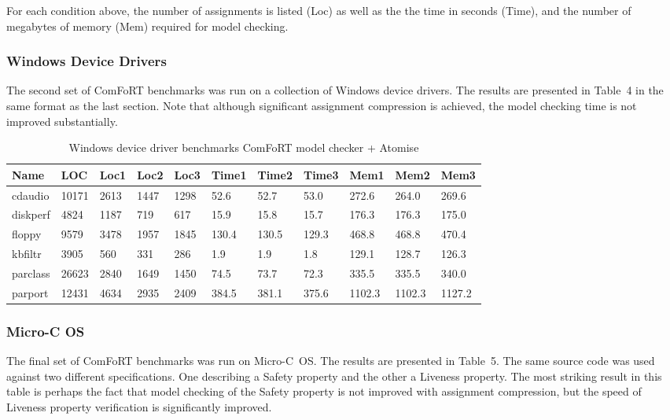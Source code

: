 For each condition above, the number of assignments is listed (Loc) as
well as the the time in seconds (Time), and the number of megabytes of
memory (Mem) required for model checking.

\subsubsection{Windows Device Drivers}

The second set of ComFoRT benchmarks was run on a collection of
Windows device drivers.  The results are presented in Table~4 in the
same format as the last section.  Note that although significant
assignment compression is achieved, the model checking time is not
improved substantially.

\begin{table}
\begin{scriptsize}
\begin{tabular}{|l|l|l|l|l|l|l|l|l|l|l|} \hline
Name & LOC & Loc1 & Loc2 & Loc3 & Time1 & Time2 & Time3 & Mem1 & Mem2
& Mem3 \\ \hline
cdaudio & 10171 & 2613 & 1447 & 1298 & 52.6 & 52.7 & 53.0 & 272.6 &
264.0 & 269.6\\ \hline
diskperf & 4824 & 1187 & 719 & 617 & 15.9 & 15.8 & 15.7 & 176.3 &
176.3 & 175.0 \\ \hline
floppy & 9579 & 3478 & 1957 & 1845 & 130.4 & 130.5 & 129.3 & 468.8 &
468.8 & 470.4 \\ \hline
kbfiltr & 3905 & 560 & 331 & 286 & 1.9 & 1.9 & 1.8 & 129.1 & 128.7 &
126.3 \\ \hline
parclass & 26623 & 2840 & 1649 & 1450 & 74.5 & 73.7 & 72.3 & 335.5 &
335.5 & 340.0 \\ \hline
parport & 12431 & 4634 & 2935 & 2409 & 384.5 & 381.1 & 375.6 & 1102.3
& 1102.3 & 1127.2 \\ \hline
\end{tabular}
\label{windows}
\caption{Windows device driver benchmarks ComFoRT model checker + Atomise}
\end{scriptsize}
\end{table}

\subsubsection{Micro-C OS}

The final set of ComFoRT benchmarks was run on Micro-C~OS.  The results
are presented in Table~5.  The same source code was used
against two different specifications.  One describing a Safety
property and the other a Liveness property.  The most striking result
in this table is perhaps the fact that model checking of the Safety
property is not improved with assignment compression, but the speed of
Liveness property verification is significantly improved.

